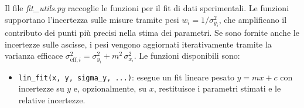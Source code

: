 \vspace{-15pt}
Il file \textit{fit\_utils.py} raccoglie le funzioni per il fit di dati sperimentali. Le funzioni supportano l'incertezza sulle misure tramite pesi $w_i = 1/\sigma_{y_i}^2$, che amplificano il contributo dei punti più precisi nella stima dei parametri. Se sono fornite anche le incertezze sulle ascisse, i pesi vengono aggiornati iterativamente tramite la varianza efficace $\sigma_{\mathrm{eff},i}^2 = \sigma_{y_i}^2 + m^2\,\sigma_{x_i}^2$.
\vspace{-5pt}
Le funzioni disponibili sono:
\begin{itemize}
    \item \texttt{lin\_fit(x, y, sigma\_y, ...)}: esegue un fit lineare pesato $y = mx + c$ con incertezze su $y$ e, opzionalmente, su $x$, restituisce i parametri stimati e le relative incertezze.
\end{itemize}
\vspace{-11pt}

